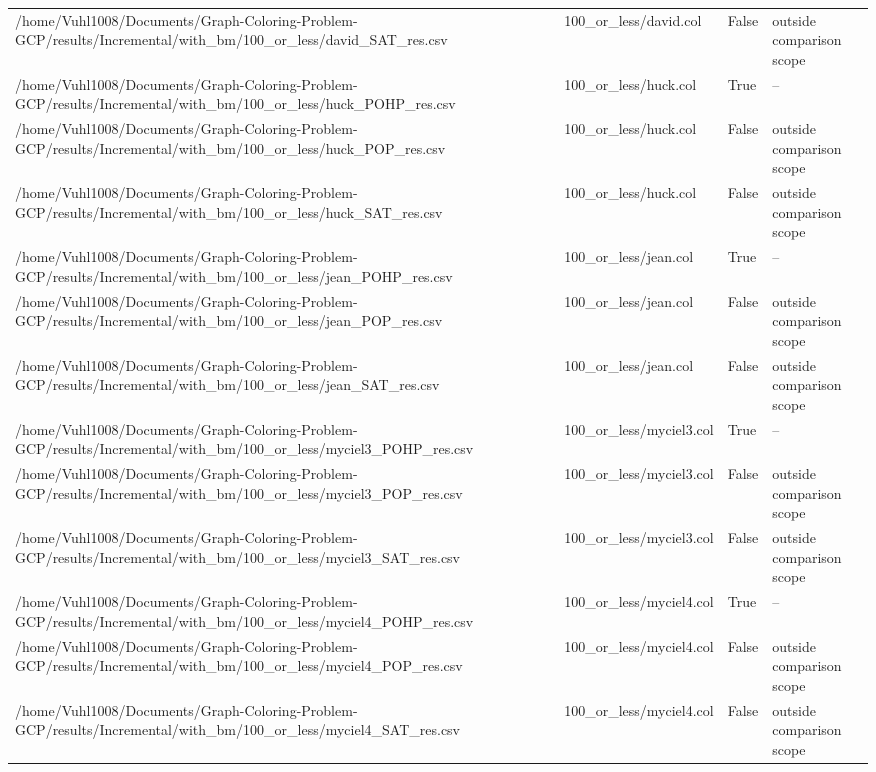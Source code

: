 \begin{table}[htbp]
\begin{tabular}{llll}
/home/Vuhl1008/Documents/Graph-Coloring-Problem-GCP/results/Incremental/with\_bm/100\_or\_less/david\_SAT\_res.csv & 100\_or\_less/david.col & False & outside comparison scope \\
/home/Vuhl1008/Documents/Graph-Coloring-Problem-GCP/results/Incremental/with\_bm/100\_or\_less/huck\_POHP\_res.csv & 100\_or\_less/huck.col & True & -- \\
/home/Vuhl1008/Documents/Graph-Coloring-Problem-GCP/results/Incremental/with\_bm/100\_or\_less/huck\_POP\_res.csv & 100\_or\_less/huck.col & False & outside comparison scope \\
/home/Vuhl1008/Documents/Graph-Coloring-Problem-GCP/results/Incremental/with\_bm/100\_or\_less/huck\_SAT\_res.csv & 100\_or\_less/huck.col & False & outside comparison scope \\
/home/Vuhl1008/Documents/Graph-Coloring-Problem-GCP/results/Incremental/with\_bm/100\_or\_less/jean\_POHP\_res.csv & 100\_or\_less/jean.col & True & -- \\
/home/Vuhl1008/Documents/Graph-Coloring-Problem-GCP/results/Incremental/with\_bm/100\_or\_less/jean\_POP\_res.csv & 100\_or\_less/jean.col & False & outside comparison scope \\
/home/Vuhl1008/Documents/Graph-Coloring-Problem-GCP/results/Incremental/with\_bm/100\_or\_less/jean\_SAT\_res.csv & 100\_or\_less/jean.col & False & outside comparison scope \\
/home/Vuhl1008/Documents/Graph-Coloring-Problem-GCP/results/Incremental/with\_bm/100\_or\_less/myciel3\_POHP\_res.csv & 100\_or\_less/myciel3.col & True & -- \\
/home/Vuhl1008/Documents/Graph-Coloring-Problem-GCP/results/Incremental/with\_bm/100\_or\_less/myciel3\_POP\_res.csv & 100\_or\_less/myciel3.col & False & outside comparison scope \\
/home/Vuhl1008/Documents/Graph-Coloring-Problem-GCP/results/Incremental/with\_bm/100\_or\_less/myciel3\_SAT\_res.csv & 100\_or\_less/myciel3.col & False & outside comparison scope \\
/home/Vuhl1008/Documents/Graph-Coloring-Problem-GCP/results/Incremental/with\_bm/100\_or\_less/myciel4\_POHP\_res.csv & 100\_or\_less/myciel4.col & True & -- \\
/home/Vuhl1008/Documents/Graph-Coloring-Problem-GCP/results/Incremental/with\_bm/100\_or\_less/myciel4\_POP\_res.csv & 100\_or\_less/myciel4.col & False & outside comparison scope \\
/home/Vuhl1008/Documents/Graph-Coloring-Problem-GCP/results/Incremental/with\_bm/100\_or\_less/myciel4\_SAT\_res.csv & 100\_or\_less/myciel4.col & False & outside comparison scope \\

\end{tabular}
\end{table}
